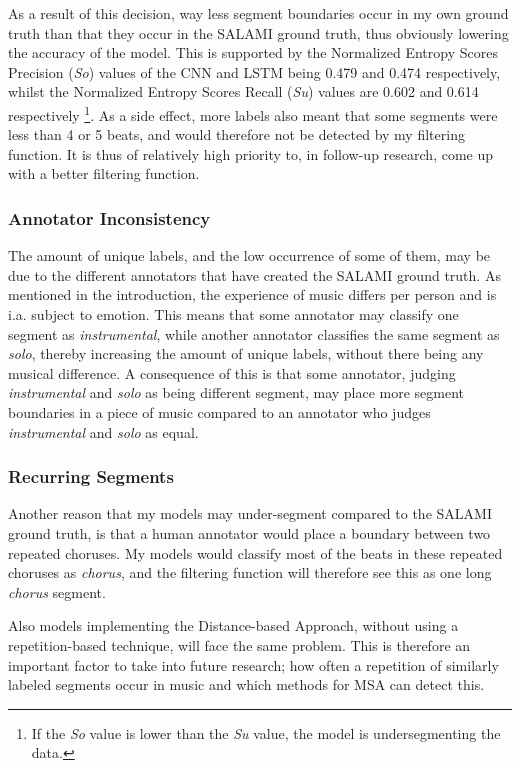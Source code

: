 As a result of this decision, way less segment boundaries occur in my own ground truth than that they occur in the SALAMI ground truth, thus obviously lowering the accuracy of the model. This is supported by the Normalized Entropy Scores Precision (\textit{So}) values of the CNN and LSTM being 0.479 and 0.474 respectively, whilst the Normalized Entropy Scores Recall (\textit{Su}) values are 0.602 and 0.614 respectively \cite{Lukashevich2008towards}\footnote{If the \textit{So} value is lower than the \textit{Su} value, the model is undersegmenting the data.}. As a side effect, more labels also meant that some segments were less than 4 or 5 beats, and would therefore not be detected by my filtering function. It is thus of relatively high priority to, in follow-up research, come up with a better filtering function.

\subsubsection{Annotator Inconsistency}
The amount of unique labels, and the low occurrence of some of them, may be due to the different annotators that have created the SALAMI ground truth. As mentioned in the introduction, the experience of music differs per person and is i.a. subject to emotion. This means that some annotator may classify one segment as \textit{instrumental}, while another annotator classifies the same segment as \textit{solo}, thereby increasing the amount of unique labels, without there being any musical difference. A consequence of this is that some annotator, judging \textit{instrumental} and \textit{solo} as being different segment, may place more segment boundaries in a piece of music compared to an annotator who judges \textit{instrumental} and \textit{solo} as equal.

\subsubsection{Recurring Segments}
Another reason that my models may under-segment compared to the SALAMI ground truth, is that a human annotator would place a boundary between two repeated choruses. My models would classify most of the beats in these repeated choruses as \textit{chorus}, and the filtering function will therefore see this as one long \textit{chorus} segment.

Also models implementing the Distance-based Approach, without using a repetition-based technique, will face the same problem. This is therefore an important factor to take into future research; how often a repetition of similarly labeled segments occur in music and which methods for MSA can detect this.

